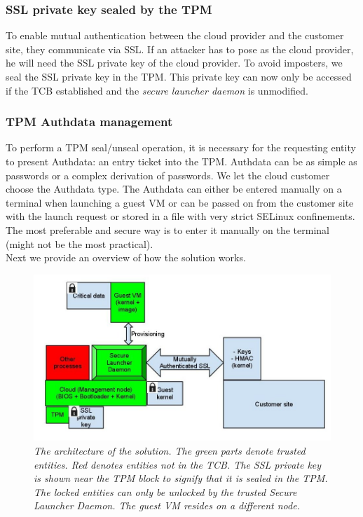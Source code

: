 \documentclass[10pt,twocolumn,pdftex]{article}
\begin{document}
\subsubsection{SSL private key sealed by the TPM}
To enable mutual authentication between the cloud provider and the customer site, they communicate via SSL. If an attacker has to pose as the cloud provider, he will need the SSL private key of the cloud provider. To avoid imposters, we seal the SSL private key in the TPM. This private key can now only be accessed if the TCB established and the \emph{secure launcher daemon} is unmodified.

\subsubsection{TPM Authdata management}
To perform a TPM seal/unseal operation, it is necessary for the requesting entity to present Authdata: an entry ticket into the TPM. Authdata can be as simple as passwords or a complex derivation of passwords. We let the cloud customer choose the Authdata type. The Authdata can either be entered manually on a terminal when launching a guest VM or can be passed on from the customer site with the launch request or stored in a file with very strict SELinux confinements. The most preferable and secure way is to enter it manually on the terminal (might not be the most practical). 
\\

Next we provide an overview of how the solution works.

\begin{figure}[htp]
\centering
\includegraphics[scale=0.50]{csc574-solution.jpg}
\caption{\small \sl The architecture of the solution. The green parts denote trusted entities. Red denotes entities not in the TCB. The SSL private key is shown near the TPM block to signify that it is sealed in the TPM. The locked entities can only be unlocked by the trusted Secure Launcher Daemon. The guest VM resides on a different node. }
\label{fig:solution}
\end{figure}
\end{document}
